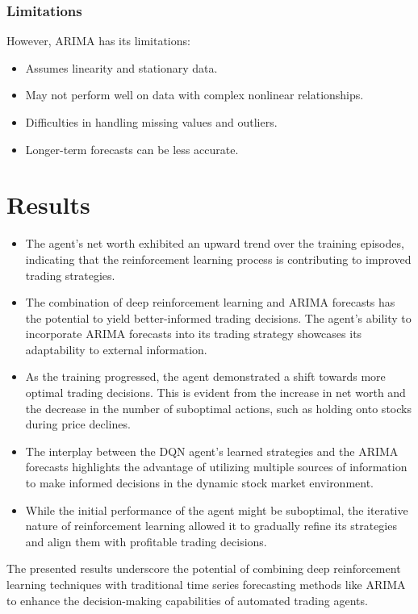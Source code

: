 \documentclass{article}
\begin{document}
\subsubsection{Limitations}
However, ARIMA has its limitations:

\begin{itemize}
    \item Assumes linearity and stationary data.
    \item May not perform well on data with complex nonlinear relationships.
    \item Difficulties in handling missing values and outliers.
    \item Longer-term forecasts can be less accurate.
\end{itemize}

\section{Results }


\begin{itemize}
    \item The agent's net worth exhibited an upward trend over the training episodes, indicating that the reinforcement learning process is contributing to improved trading strategies.
    
    \item The combination of deep reinforcement learning and ARIMA forecasts has the potential to yield better-informed trading decisions. The agent's ability to incorporate ARIMA forecasts into its trading strategy showcases its adaptability to external information.
    
    \item As the training progressed, the agent demonstrated a shift towards more optimal trading decisions. This is evident from the increase in net worth and the decrease in the number of suboptimal actions, such as holding onto stocks during price declines.
    
    \item The interplay between the DQN agent's learned strategies and the ARIMA forecasts highlights the advantage of utilizing multiple sources of information to make informed decisions in the dynamic stock market environment.
    
    \item While the initial performance of the agent might be suboptimal, the iterative nature of reinforcement learning allowed it to gradually refine its strategies and align them with profitable trading decisions.
\end{itemize}

The presented results underscore the potential of combining deep reinforcement learning techniques with traditional time series forecasting methods like ARIMA to enhance the decision-making capabilities of automated trading agents.
\end{document}
